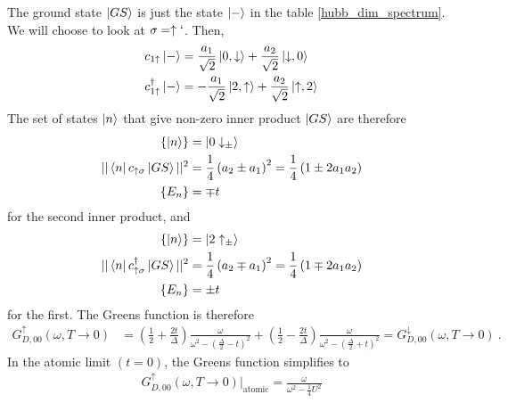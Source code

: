 \documentclass[12pt]{article}
\numberwithin{equation}{section}
\begin{document}
The ground state $\ket{GS}$ is just the state $\ket{-}$ in the table \ref{hubb_dim_spectrum}. We will choose to look at $\sigma = \uparrow`$. Then,
\begin{equation}\begin{aligned}
	c_{1\uparrow}\ket{-} &= \frac{a_1}{\sqrt 2}\ket{0, \downarrow} + \frac{a_2}{\sqrt 2}\ket{\downarrow,0}\\
	c^\dagger_{1\uparrow}\ket{-} &= -\frac{a_1}{\sqrt 2}\ket{2, \uparrow} + \frac{a_2}{\sqrt 2}\ket{\uparrow,2}\\
\end{aligned}\end{equation}
The set of states $\ket{n}$ that give non-zero inner product $\ket{GS}$ are therefore
\begin{equation}\begin{aligned}
	\left\{ \ket{n} \right\} &= \ket{0\downarrow_\pm}\\
	||\bra{n}c_{\uparrow\sigma}\ket{GS}||^2 &= \frac{1}{4}\left(a_2 \pm a_1 \right)^2 = \frac{1}{4}\left(1 \pm 2a_1a_2\right)\\
	\left\{ E_n \right\} &= \mp t
\end{aligned}\end{equation}
for the second inner product, and
\begin{equation}\begin{aligned}
	\left\{\ket{n}\right\} &= \ket{2\uparrow_\pm}\\
	||\bra{n}c^\dagger_{\uparrow\sigma}\ket{GS}||^2 &= \frac{1}{4}\left( a_2 \mp a_1 \right)^2 = \frac{1}{4}\left(1 \mp 2a_1a_2\right)\\
	\left\{ E_n \right\} &= \pm t
\end{aligned}\end{equation}
for the first. The Greens function is therefore
\begin{equation}\begin{aligned}
	\label{dimer_local_G}
	G_{D,00}^\uparrow(\omega, T \to 0) &= \left( \frac{1}{2} + \frac{2t}{\Delta} \right) \frac{\omega}{\omega^2 - \left(\frac{\Delta}{2} - t\right) ^2} + \left( \frac{1}{2} - \frac{2t}{\Delta} \right) \frac{\omega}{\omega^2 - \left(\frac{\Delta}{2} + t\right) ^2} = G_{D,00}^\downarrow(\omega, T \to 0)~.
\end{aligned}\end{equation}
In the atomic limit $(t=0)$, the Greens function simplifies to
\begin{equation}\begin{aligned}
	G_{D,00}^\uparrow(\omega, T \to 0) \bigg\vert_\text{atomic} = \frac{\omega}{\omega^2 - \frac{1}{4}U^2}
\end{aligned}\end{equation}
\end{document}
